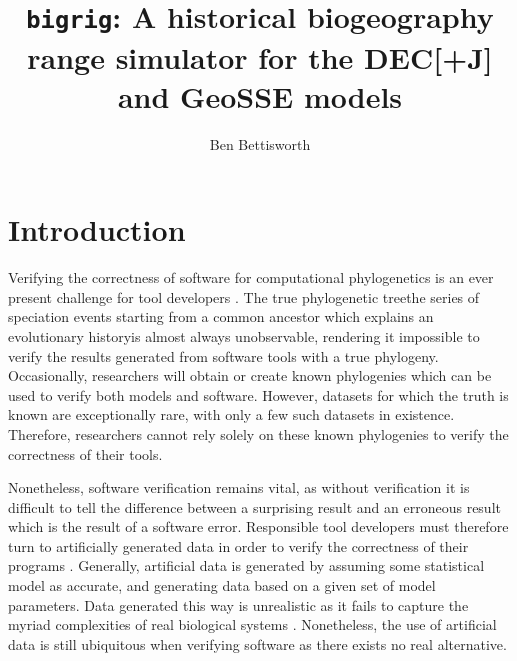\documentclass[a4paper]{article}
\title{\texttt{bigrig}: A historical biogeography range simulator for the
	DEC[+J] and GeoSSE models}
\author{Ben Bettisworth}
\begin{document}
\maketitle

\section{Introduction}

Verifying the correctness of software for computational phylogenetics is an ever present challenge for tool developers
\cite{darribaStateSoftwareEvolutionary2018, mendesHowValidateBayesian2025, carver_software_2007,
bettisworth_lagrange-ng_2023}. 
The true phylogenetic tree\textemdash the series of speciation events starting from a common ancestor which explains an
evolutionary history\textemdash is almost always unobservable, rendering it impossible to verify the results generated
from software tools with a true phylogeny.
Occasionally, researchers will obtain or create known phylogenies \cite{hillis_experimental_1992} which can be used to
verify both models and software. 
However, datasets for which the truth is known are exceptionally rare, with only a few such datasets in existence.
Therefore, researchers cannot rely solely on these known phylogenies to verify the correctness of their tools.

Nonetheless, software verification remains vital, as without verification it is difficult to tell the difference between
a surprising result and an erroneous result which is the result of a software error.
Responsible tool developers must therefore turn to artificially generated data in order to verify the correctness of
their programs \cite{mendesHowValidateBayesian2025, ly-trong_alisim_2022, fletcher_indelible_2009}.
Generally, artificial data is generated by assuming some statistical model as accurate, and generating data based on
a given set of model parameters.
Data generated this way is unrealistic as it fails to capture the myriad complexities of real biological systems
\cite{trost_simulations_2024}.
Nonetheless, the use of artificial data is still ubiquitous when verifying software as there exists no real alternative.
\end{document}
